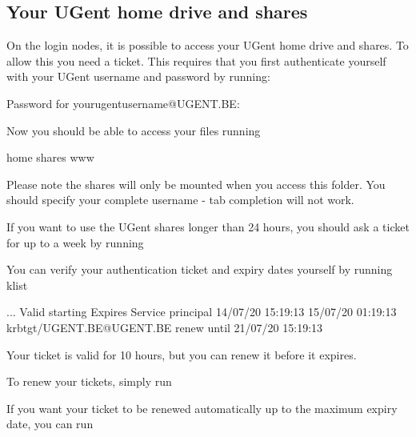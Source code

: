\ifgent
\subsection{Your UGent home drive and shares \label{subsec:ugent-shares}}

On the login nodes, it is possible to access your UGent home drive and shares.
To allow this you need a ticket. This requires that you first authenticate yourself with your UGent username and password by running:

\begin{prompt}
Password for yourugentusername@UGENT.BE:
\end{prompt}

Now you should be able to access your files running

\begin{prompt}
home  shares  www
\end{prompt}

Please note the shares will only be mounted when you access this folder.
You should specify your complete username - tab completion will not work.


If you want to use the UGent shares longer than 24 hours,
you should ask a ticket for up to a week by running

\begin{prompt}
\end{prompt}

You can verify your authentication ticket and expiry dates yourself by running klist

\begin{prompt}
...
Valid starting     Expires            Service principal
14/07/20 15:19:13  15/07/20 01:19:13  krbtgt/UGENT.BE@UGENT.BE
	renew until 21/07/20 15:19:13

\end{prompt}

Your ticket is valid for 10 hours, but you can renew it before it expires.

To renew your tickets, simply run

\begin{prompt}
\end{prompt}

If you want your ticket to be renewed automatically up to the maximum expiry date, you can run


